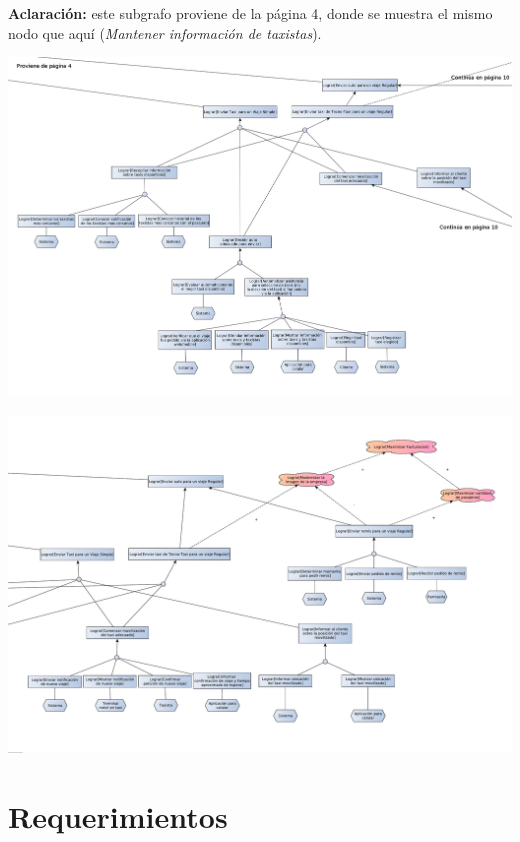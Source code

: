 \documentclass[a4paper]{article}
\begin{document}
\begin{center}
\begin{flushleft}
\textbf{Aclaraci\'on:} este subgrafo proviene de la p\'agina 4, donde se muestra el mismo nodo que aqu\'i (\textit{Mantener informaci\'on de taxistas}).
\end{flushleft}
\includegraphics[width=1.3\textwidth,keepaspectratio,angle=90]{diag_objetivos_partido/diag_objetivos_7_pag.png}

\includegraphics[width=1.3\textwidth,keepaspectratio,angle=90]{diag_objetivos_partido/diag_objetivos_8.pdf}

\begin{flushleft}
\tabu \tabu \tabu \tabu  [A p\'agina 4] \tabu \tabu \tabu \tabu \tabu [A p\'agina 9]
\end{flushleft}


\end{center}


\newpage
\section{Requerimientos}
\end{document}
